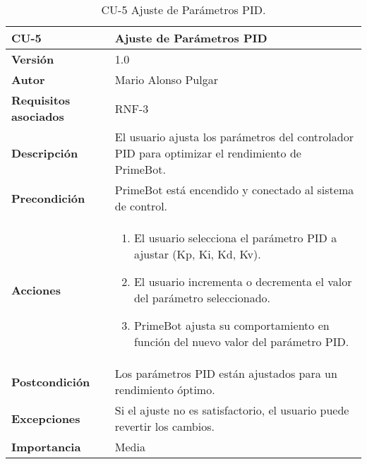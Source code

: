 \begin{table}[p]
	\centering
	\begin{tabularx}{\linewidth}{ p{} p{} }
		\toprule
		\textbf{CU-5}    & \textbf{Ajuste de Parámetros PID}\\
		\toprule
		\textbf{Versión}              & 1.0    \\
		\textbf{Autor}                & Mario Alonso Pulgar \\
		\textbf{Requisitos asociados} & RNF-3 \\
		\textbf{Descripción}          & El usuario ajusta los parámetros del controlador PID para optimizar el rendimiento de PrimeBot.\\
		\textbf{Precondición}         & PrimeBot está encendido y conectado al sistema de control.\\
		\textbf{Acciones}             &
		\begin{enumerate}
			\def\labelenumi{\arabic{enumi}.}
			\tightlist
			\item El usuario selecciona el parámetro PID a ajustar (Kp, Ki, Kd, Kv).
			\item El usuario incrementa o decrementa el valor del parámetro seleccionado.
			\item PrimeBot ajusta su comportamiento en función del nuevo valor del parámetro PID.
		\end{enumerate}\\
		\textbf{Postcondición}        & Los parámetros PID están ajustados para un rendimiento óptimo.\\
		\textbf{Excepciones}          & Si el ajuste no es satisfactorio, el usuario puede revertir los cambios. \\
		\textbf{Importancia}          & Media \\
		\bottomrule
	\end{tabularx}
	\caption{CU-5 Ajuste de Parámetros PID.}
\end{table}